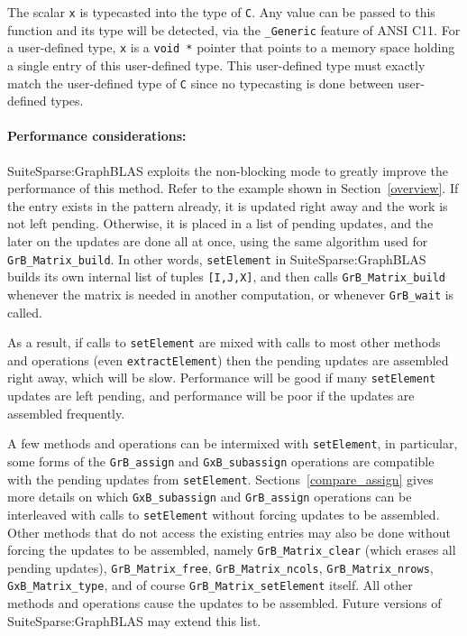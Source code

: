\documentclass[12pt]{article}
\begin{document}
The scalar \verb'x' is typecasted into the type of \verb'C'.  Any value can be
passed to this function and its type will be detected, via the \verb'_Generic'
feature of ANSI C11.  For a user-defined type, \verb'x' is a \verb'void *'
pointer that points to a memory space holding a single entry of this
user-defined type.  This user-defined type must exactly match the user-defined
type of \verb'C' since no typecasting is done between user-defined types.

\paragraph{\bf Performance considerations:} %
SuiteSparse:GraphBLAS exploits the non-blocking mode to greatly improve the
performance of this method.  Refer to the example shown in
Section~\ref{overview}.  If the entry exists in the pattern already, it is
updated right away and the work is not left pending.  Otherwise, it is placed
in a list of pending updates, and the later on the updates are done all at
once, using the same algorithm used for \verb'GrB_Matrix_build'.  In other
words, \verb'setElement' in SuiteSparse:GraphBLAS builds its own internal list
of tuples \verb'[I,J,X]', and then calls \verb'GrB_Matrix_build' whenever the
matrix is needed in another computation, or whenever \verb'GrB_wait' is called.

As a result, if calls to \verb'setElement' are mixed with calls to most other
methods and operations (even \verb'extractElement') then the pending updates
are assembled right away, which will be slow.  Performance will be good if many
\verb'setElement' updates are left pending, and performance will be poor if the
updates are assembled frequently.

A few methods and operations can be intermixed with \verb'setElement', in
particular, some forms of the \verb'GrB_assign' and \verb'GxB_subassign'
operations are compatible with the pending updates from \verb'setElement'.
Sections~\ref{compare_assign} gives more details on which \verb'GxB_subassign'
and \verb'GrB_assign' operations can be interleaved with calls to
\verb'setElement' without forcing updates to be assembled.  Other methods that
do not access the existing entries may also be done without forcing the updates
to be assembled, namely \verb'GrB_Matrix_clear' (which erases all pending
updates), \verb'GrB_Matrix_free', \verb'GrB_Matrix_ncols',
\verb'GrB_Matrix_nrows', \verb'GxB_Matrix_type', and of course
\verb'GrB_Matrix_setElement' itself.  All other methods and operations cause
the updates to be assembled.  Future versions of SuiteSparse:GraphBLAS may
extend this list.
\end{document}
